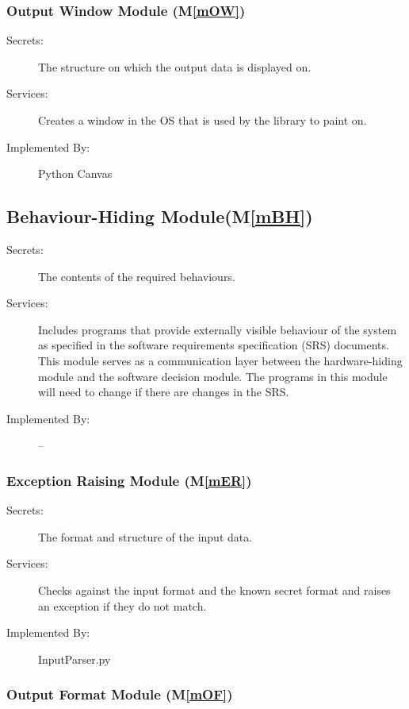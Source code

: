\documentclass[12pt, titlepage]{article}
\newcommand{\mref}[1]{M\ref{#1}}
\begin{document}
\subsubsection{Output Window Module (\mref{mOW})}

\begin{description}
\item[Secrets:]The structure on which the output data is displayed on.
\item[Services:]Creates a window in the OS that is used by the library to paint on. 
\item[Implemented By:] Python Canvas
\end{description}

\subsection{Behaviour-Hiding Module(\mref{mBH})}

\begin{description}
\item[Secrets:]The contents of the required behaviours.
\item[Services:]Includes programs that provide externally visible behaviour of
  the system as specified in the software requirements specification (SRS)
  documents. This module serves as a communication layer between the
  hardware-hiding module and the software decision module. The programs in this
  module will need to change if there are changes in the SRS.
\item[Implemented By:] --
\end{description}

\subsubsection{Exception Raising Module (\mref{mER})}

\begin{description}
\item[Secrets:] The format and structure of the input data.
\item[Services:] Checks against the input format and the known secret format and raises an exception if they do not match.
\item[Implemented By:] InputParser.py
\end{description}

\subsubsection{Output Format Module (\mref{mOF})}
\end{document}
